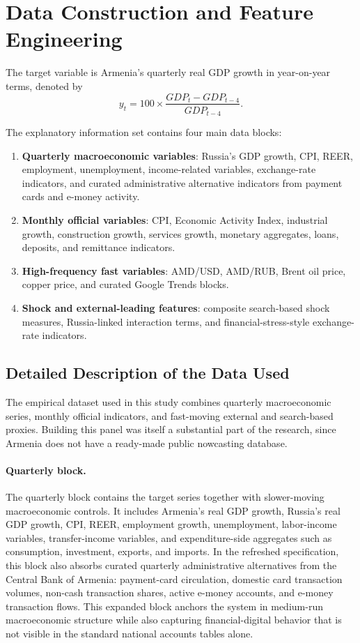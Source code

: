 \documentclass[12pt,a4paper]{article}
\begin{document}
\section{Data Construction and Feature Engineering}

The target variable is Armenia's quarterly real GDP growth in year-on-year terms, denoted by
\begin{equation}
    y_t = 100 \times \frac{GDP_t - GDP_{t-4}}{GDP_{t-4}}.
\end{equation}

The explanatory information set contains four main data blocks:
\begin{enumerate}
    \item \textbf{Quarterly macroeconomic variables}: Russia's GDP growth, CPI, REER, employment, unemployment, income-related variables, exchange-rate indicators, and curated administrative alternative indicators from payment cards and e-money activity.
    \item \textbf{Monthly official variables}: CPI, Economic Activity Index, industrial growth, construction growth, services growth, monetary aggregates, loans, deposits, and remittance indicators.
    \item \textbf{High-frequency fast variables}: AMD/USD, AMD/RUB, Brent oil price, copper price, and curated Google Trends blocks.
    \item \textbf{Shock and external-leading features}: composite search-based shock measures, Russia-linked interaction terms, and financial-stress-style exchange-rate indicators.
\end{enumerate}

\subsection{Detailed Description of the Data Used}

The empirical dataset used in this study combines quarterly macroeconomic series, monthly official indicators, and fast-moving external and search-based proxies. Building this panel was itself a substantial part of the research, since Armenia does not have a ready-made public nowcasting database.

\paragraph{Quarterly block.}
The quarterly block contains the target series together with slower-moving macroeconomic controls. It includes Armenia's real GDP growth, Russia's real GDP growth, CPI, REER, employment growth, unemployment, labor-income variables, transfer-income variables, and expenditure-side aggregates such as consumption, investment, exports, and imports. In the refreshed specification, this block also absorbs curated quarterly administrative alternatives from the Central Bank of Armenia: payment-card circulation, domestic card transaction volumes, non-cash transaction shares, active e-money accounts, and e-money transaction flows. This expanded block anchors the system in medium-run macroeconomic structure while also capturing financial-digital behavior that is not visible in the standard national accounts tables alone.
\end{document}
